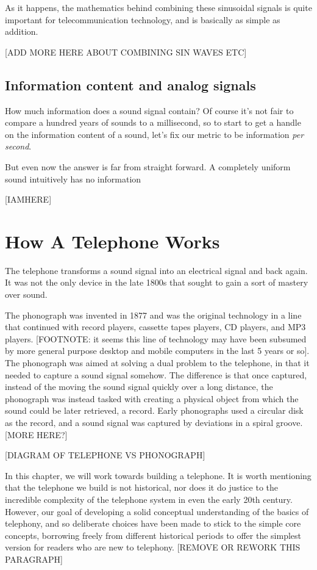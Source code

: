 \documentclass[UTF8]{book}
\begin{document}
\begin{CJK}{UTF8}{gbsn}
As it happens, the mathematics behind combining these sinusoidal signals is quite important for telecommunication technology, and is basically as simple as addition.

[ADD MORE HERE ABOUT COMBINING SIN WAVES ETC]

\section{Information content and analog signals}

How much information does a sound signal contain? Of course it's not fair to compare a hundred years of sounds to a millisecond, so to start to get a handle on the information content of a sound, let's fix our metric to be information \emph{per second}.

But even now the answer is far from straight forward. A completely uniform sound intuitively has no information

[IAMHERE]

\chapter{How A Telephone Works}

The telephone transforms a sound signal into an electrical signal and back again. It was not the only device in the late 1800s that sought to gain a sort of mastery over sound.

The phonograph was invented in 1877 and was the original technology in a line that continued with record players, cassette tapes players, CD players, and MP3 players. [FOOTNOTE: it seems this line of technology may have been subsumed by more general purpose desktop and mobile computers in the last 5 years or so]. The phonograph was aimed at solving a dual problem to the telephone, in that it needed to capture a sound signal somehow. The difference is that once captured, instead of the moving the sound signal quickly over a long distance, the phonograph was instead tasked with creating a physical object from which the sound could be later retrieved, a record. Early phonographs used a circular disk as the record, and a sound signal was captured by deviations in a spiral groove. [MORE HERE?]

[DIAGRAM OF TELEPHONE VS PHONOGRAPH]

In this chapter, we will work towards building a telephone. It is worth mentioning that the telephone we build is not historical, nor does it do justice to the incredible complexity of the telephone system in even the early 20th century. However, our goal of developing a solid conceptual understanding of the basics of telephony, and so deliberate choices have been made to stick to the simple core concepts, borrowing freely from different historical periods to offer the simplest version for readers who are new to telephony. [REMOVE OR REWORK THIS PARAGRAPH]


\end{CJK}
\end{document}
